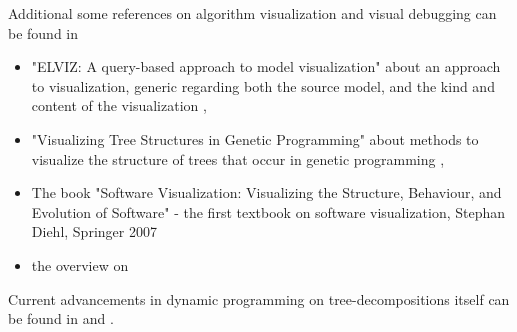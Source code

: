 \documentclass[a4paper, 12pt, bibliography=totoc]{scrartcl}
\begin{document}
Additional some references on algorithm visualization and visual debugging can be found in
\begin{itemize}
	\item "ELVIZ: A query-based approach to model visualization" about an approach to visualization, generic regarding both the source model, and the kind and content of the visualization \cite{ELVIZ},
	
	\item "Visualizing Tree Structures in Genetic Programming" about methods to visualize the structure of trees that occur in genetic programming \cite{VisuTDinGP},
	
	\item The book "Software Visualization: Visualizing the Structure, Behaviour, and Evolution of Software" - the first textbook on software visualization, Stephan Diehl, Springer 2007 \cite{SoftwareVisualization}
	
	\item the overview on 
\end{itemize}

Current advancements in dynamic programming on tree-decompositions itself can be found in \cite{dpdbpadl2020} and \cite{taminghightw}.
%

%
\end{document}
